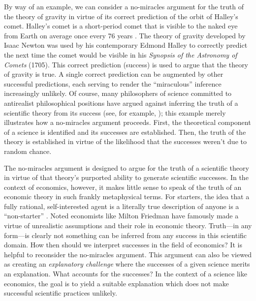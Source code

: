By way of an example, we can consider a no-miracles argument for the truth of the theory of gravity in virtue of its correct prediction of the orbit of Halley's comet. Halley's comet is a short-period comet that is visible to the naked eye from Earth on average once every 76 years \autocite{nasa_halley}. The theory of gravity developed by Isaac Newton was used by his contemporary Edmond Halley to correctly predict the next time the comet would be visible in his \textit{Synopsis of the Astronomy of Comets} (1705). This correct prediction (success) is used to argue that the theory of gravity is true. A single correct prediction can be augmented by other successful predictions, each serving to render the ``miraculous'' inference increasingly unlikely. Of course, many philosophers of science committed to antirealist philosophical positions have argued against inferring the truth of a scientific theory from its success (see, for example, \cite{stanford2000}); this example merely illustrates how a no-miracles argument proceeds. First, the theoretical component of a science is identified and its successes are established. Then, the truth of the theory is established in virtue of the likelihood that the successes weren't due to random chance.

The no-miracles argument is designed to argue for the truth of a scientific theory in virtue of that theory's purported ability to generate scientific successes. In the context of economics, however, it makes little sense to speak of the truth of an economic theory in such frankly metaphysical terms. For starters, the idea that a fully rational, self-interested agent is a literally true description of anyone is a ``non-starter'' \autocite[328]{alexandrova2009}. Noted economists like Milton Friedman \autocite*{friedman1953} have famously made a virtue of unrealistic assumptions and their role in economic theory. Truth---in any form---is clearly not something can be inferred from any success in this scientific domain. How then should we interpret successes in the field of economics? It is helpful to reconsider the no-miracles argument. This argument can also be viewed as creating an \textit{explanatory challenge} where the successes of a given science merits an explanation. What accounts for the successes? In the context of a science like economics, the goal is to yield a suitable explanation which does not make successful scientific practices unlikely.

